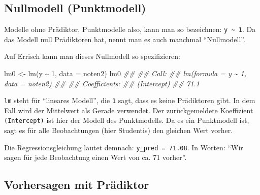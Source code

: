 \documentclass[
  letterpaper,
]{scrbook}
\newenvironment{Shaded}{\begin{snugshade}}{\end{snugshade}}
\newcommand{\AttributeTok}[1]{\textcolor[rgb]{0.40,0.45,0.13}{#1}}
\newcommand{\DecValTok}[1]{\textcolor[rgb]{0.68,0.00,0.00}{#1}}
\newcommand{\DocumentationTok}[1]{\textcolor[rgb]{0.37,0.37,0.37}{\textit{#1}}}
\newcommand{\FunctionTok}[1]{\textcolor[rgb]{0.28,0.35,0.67}{#1}}
\newcommand{\NormalTok}[1]{\textcolor[rgb]{0.00,0.23,0.31}{#1}}
\newcommand{\OtherTok}[1]{\textcolor[rgb]{0.00,0.23,0.31}{#1}}
\newcommand{\SpecialCharTok}[1]{\textcolor[rgb]{0.37,0.37,0.37}{#1}}
\theoremstyle{definition}
\theoremstyle{definition}
\theoremstyle{definition}
\theoremstyle{remark}
\begin{document}
\subsection{Nullmodell (Punktmodell)}\label{nullmodell-punktmodell}

Modelle ohne Prädiktor, Punktmodelle also, kann man so bezeichnen:
\texttt{y\ \textasciitilde{}\ 1}. Da das Modell null Prädiktoren hat,
nennt man es auch manchmal ``Nullmodell''.

Auf Errisch kann man dieses Nullmodell so spezifizieren:

\begin{Shaded}
\begin{Highlighting}[]
\NormalTok{lm0 }\OtherTok{\textless{}{-}} \FunctionTok{lm}\NormalTok{(y }\SpecialCharTok{\textasciitilde{}} \DecValTok{1}\NormalTok{, }\AttributeTok{data =}\NormalTok{ noten2)}
\NormalTok{lm0}
\DocumentationTok{\#\# }
\DocumentationTok{\#\# Call:}
\DocumentationTok{\#\# lm(formula = y \textasciitilde{} 1, data = noten2)}
\DocumentationTok{\#\# }
\DocumentationTok{\#\# Coefficients:}
\DocumentationTok{\#\# (Intercept)  }
\DocumentationTok{\#\#        71.1}
\end{Highlighting}
\end{Shaded}

\texttt{lm} steht für ``lineares Modell'', die \texttt{1} sagt, dass es
keine Prädiktoren gibt. In dem Fall wird der Mittelwert als Gerade
verwendet. Der zurückgemeldete Koeffizient \texttt{(Intercept)} ist hier
der Modell des Punktmodells. Da es ein Punktmodell ist, sagt es für alle
Beobachtungen (hier Studentis) den gleichen Wert vorher.

Die Regressionsgleichung lautet demnach: \texttt{y\_pred\ =\ 71.08}. In
Worten: ``Wir sagen für jede Beobachtung einen Wert von ca. 71 vorher''.

\subsection{Vorhersagen mit
Prädiktor}\label{vorhersagen-mit-pruxe4diktor}
\end{document}
